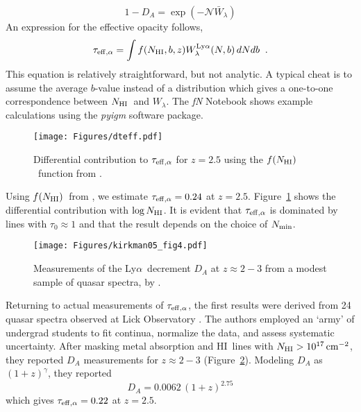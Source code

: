 \documentclass[graybox]{svmult}
\newcommand{\HI}{H{\sc I}}
\def\lya{Ly$\alpha$}
\newcommand{\mnhi}{N_{\rm HI}}
\newcommand{\nhi}{$\mnhi$}
\def\cm#1{\, {\rm cm^{#1}}}
\def\mfnhi{f(\mnhi)}
\def\fnhi{$\mfnhi$}
\begin{document}
\begin{equation}
1-D_A = \exp (-\mathcal{N} \bar W_\lambda)
\end{equation}
An expression for the effective opacity follows, 
\begin{equation}
\tau_{\rm eff, \alpha} = \int f(\mnhi,b,z) 
W^{\rm Ly\alpha}_\lambda(N,b) \, dN db  \;\; .
\label{eqn:teff}
\end{equation}
This equation is relatively straightforward, but
not analytic.
A typical cheat is to assume the average $b$-value instead
of a distribution which
gives a one-to-one correspondence between \nhi\ and $W_\lambda$.
The {\it fN} Notebook shows example calculations using
the {\it pyigm} software package.

%
\begin{figure}[b]
\sidecaption
\texttt{[image: Figures/dteff.pdf]}
%
%
\caption{Differential contribution to 
$\tau_{\rm eff, \alpha}$ for $z=2.5$ using the
\fnhi\ function from \cite{pro+14}.
}
\label{fig:dteff}       %
\end{figure}

Using \fnhi\ from \cite{pro+14}, %
we estimate $\tau_{\rm eff, \alpha} = 0.24$ at $z=2.5$.
Figure~\ref{fig:dteff} shows the
differential contribution with $\log \mnhi$.
It is evident that $\tau_{\rm eff,\alpha}$
is dominated by lines with $\tau_0 \approx 1$ and
that the result
depends on the choice of $N_{\rm min}$. 

%
\begin{figure}[b]
\sidecaption
\texttt{[image: Figures/kirkman05\_fig4.pdf]}
%
%
\caption{Measurements of the \lya\ decrement
$D_A$ at $z \approx 2-3$ from a modest sample of
quasar spectra, by \cite{kts+05}.
}
\label{fig:DA}       %
\end{figure}

Returning to actual measurements of $\tau_{\rm eff,\alpha}$,
the first results were derived from
24 quasar spectra observed at Lick Observatory
\cite{kts+05}.  The authors employed an
`army' of undergrad students to fit continua,
normalize the data, and assess
systematic uncertainty.
After masking metal absorption and \HI\
lines with $\mnhi > 10^{17} \cm{-2}$, they
reported $D_A$ measurements for $z \approx 2-3$
(Figure~\ref{fig:DA}).
Modeling $D_A$ as $(1+z)^\gamma$, they reported 
\begin{equation}
D_A = 0.0062 \, (1+z)^{2.75}
\end{equation}
which gives $\tau_{\rm eff, \alpha} = 0.22$ 
at $z=2.5$.
\end{document}
